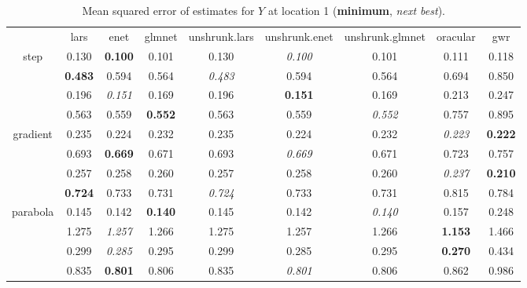 \documentclass[authoryear, review, 11pt]{elsarticle}
\begin{document}
\begin{table}[ht]
\begin{center}
\begin{tabular}{ccccccccc}
  & lars & enet & glmnet & unshrunk.lars & unshrunk.enet & unshrunk.glmnet & oracular & gwr \\ 
  \cline{2-9}
  \multirow{4}{*}{step} & 0.130 & \textbf{0.100} & 0.101 & 0.130 & \emph{0.100} & 0.101 & 0.111 & 0.118 \\ 
  & \textbf{0.483} & 0.594 & 0.564 & \emph{0.483} & 0.594 & 0.564 & 0.694 & 0.850 \\ 
  & 0.196 & \emph{0.151} & 0.169 & 0.196 & \textbf{0.151} & 0.169 & 0.213 & 0.247 \\ 
  & 0.563 & 0.559 & \textbf{0.552} & 0.563 & 0.559 & \emph{0.552} & 0.757 & 0.895 \\ 
  \cline{2-9}
  \multirow{4}{*}{gradient} & 0.235 & 0.224 & 0.232 & 0.235 & 0.224 & 0.232 & \emph{0.223} & \textbf{0.222} \\ 
  & 0.693 & \textbf{0.669} & 0.671 & 0.693 & \emph{0.669} & 0.671 & 0.723 & 0.757 \\ 
  & 0.257 & 0.258 & 0.260 & 0.257 & 0.258 & 0.260 & \emph{0.237} & \textbf{0.210} \\ 
  & \textbf{0.724} & 0.733 & 0.731 & \emph{0.724} & 0.733 & 0.731 & 0.815 & 0.784 \\ 
  \cline{2-9}
  \multirow{4}{*}{parabola} & 0.145 & 0.142 & \textbf{0.140} & 0.145 & 0.142 & \emph{0.140} & 0.157 & 0.248 \\ 
  & 1.275 & \emph{1.257} & 1.266 & 1.275 & 1.257 & 1.266 & \textbf{1.153} & 1.466 \\ 
  & 0.299 & \emph{0.285} & 0.295 & 0.299 & 0.285 & 0.295 & \textbf{0.270} & 0.434 \\ 
  & 0.835 & \textbf{0.801} & 0.806 & 0.835 & \emph{0.801} & 0.806 & 0.862 & 0.986 \\ 
  \end{tabular}
\caption{Mean squared error of estimates for $Y$ at location 1 (\textbf{minimum}, \emph{next best}).\label{table:loc1-MSEY}}
\end{center}
\end{table}
\end{document}
